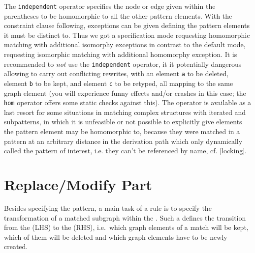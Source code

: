 The \texttt{independent} operator specifies the node or edge given within the parentheses to be homomorphic to all the other pattern elements.
With the constraint clause following, exceptions can be given defining the pattern elements it must be distinct to.
Thus we got a specification mode requesting homomorphic matching with additional isomorphy exceptions in contrast to the default mode,
requesting isomorphic matching with additional homomorphy exception.
It is recommended to \emph{not} use the \texttt{independent} operator, it it potentially dangerous allowing to carry out conflicting rewrites, with an element \texttt{a} to be deleted, element \texttt{b} to be kept, and element \texttt{c} to be retyped, all mapping to the same graph element (you will experience funny effects and/or crashes in this case; the \texttt{hom} operator offers some static checks against this).
The operator is available as a last resort for some situations in matching complex structures with iterated and subpatterns, 
in which it is unfeasible or not possible to explicitly give elements the pattern element may be homomorphic to,
because they were matched in a pattern at an arbitrary distance in the derivation path which only dynamically called the pattern of interest,
i.e. they can't be referenced by name, cf. \ref{locking}.


\section{Replace/Modify Part}
\label{sec:replacemodify}
Besides specifying the pattern, a main task of a rule is to specify the transformation of a matched subgraph within the .
Such a  defines the transition from the  (LHS) to the  (RHS), i.e.\ which graph elements of a match will be kept, which of them will be deleted and which graph elements have to be newly created.

